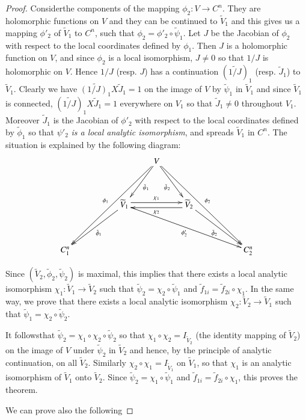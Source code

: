 \begin{proof}
Consider\pageoriginale the components of the mapping $\phi_2 : V \to
C^n$. They are holomorphic functions on $V$ and they can be continued
to $\tilde{V}_1$ and this gives us a mapping $\phi'_2$ of
$\tilde{V}_1$ to $C^n$, such that $\phi_2 = \phi'_2 \circ
\tilde{\psi}_1$. Let $J$ be the Jacobian of $\phi_2$ with respect to
the local coordinates defined by $\phi_1$. Then $J$ is a holomorphic
function on $V$, and since $\phi_2$ is a local isomorphism, $J \neq 0$
so that $1 /J$ is holomorphic on $V$. Hence $1/J$ (resp. $J$) has a
continuation $(\widetilde{1/J})_1$ (resp. $\tilde{J}_1$) to
$\tilde{V}_1$. Clearly we have $\widetilde{(1/J)_1} X\tilde{J}_1 =1 $
on the image of $V$ by $\tilde{\psi}_1$ in $\tilde{V}_1$ and since
$\tilde{V}_1$ is connected, $(\widetilde{1/J})_1 X \tilde{J}_1 =1$
everywhere on $V_1$ so that $\tilde{J}_1 \neq 0$ throughout
$V_1$. Moreover $\tilde{J}_1$ is the Jacobian of $\phi'_2$ with
respect to the local coordinates defined by $\tilde{\phi}_1$ so that
$\psi'_2$ \textit{is a local analytic isomorphism}, and spreads
$\tilde{V}_1$ in $C^n$. The situation is explained by the following
diagram:
\[
\xymatrix@R=1.3cm{
 & & & V \ar[dl]^{\tilde{\psi}_1}\ar[dr]_{\tilde{\psi}_2}
  \ar[ddlll]_{\phi_1}\ar[ddrrr]^{\phi_2} & & &\\  
 &  & \widetilde{V}_{1}
  \ar@<.3em>[rr]^{\chi_1}\ar@{<-}@<-.3em>[rr]_{\chi_2} \ar[dll]^{\tilde{\phi}_1} 
  \ar[drrrr]_{\phi'_2} && \widetilde{V}_{2}\ar[drr]_{\tilde{\phi}_2} &
  &\\  
 C^n_1 & & & & & & C^n_2 
}
\]

Since $(\tilde{V}_2, \tilde{\phi}_2, \tilde{\psi}_2)$ is maximal, this
implies that there exists a local analytic isomorphism $\chi_1:
\tilde{V}_1 \to \tilde{V}_2$ such that $\tilde{\psi}_2 = \chi_2 \circ
\tilde{\psi}_1 $ and $\tilde{f}_{1i} = \tilde{f}_{2i} \circ
\chi_1$. In the same way, we prove that there exists a local analytic
isomorphism $\chi_2 : \tilde{V}_2 \to \tilde{V}_1$ such that
$\tilde{\psi}_1 = \chi_2 \circ \tilde{\psi}_2$. 

It follows\pageoriginale that $\tilde{\psi}_2 = \chi_1 \circ \chi_2
\circ \tilde{\psi}_2$ so that $\chi_1 \circ \chi_2 = I_{\tilde{V}_2}$
(the identity mapping of $\tilde{V}_2$) on the image of $V$ under
$\tilde{\psi}_2$ in $\tilde{V}_2$ and hence, by the principle of
analytic continuation, on all $\tilde{V}_2$. Similarly $\chi_2 \circ
\chi_1 = I_{\tilde{V}_1}$ on $\tilde{V}_1$, so that $\chi_1$ is an
analytic isomorphism of $\tilde{V}_1$ onto $\tilde{V}_2$. Since
$\tilde{\psi}_2 = \chi_1 \circ \tilde{\psi}_1$ and $\tilde{f}_{1i} =
\tilde{f}_{2i} \circ \chi_1$, this proves the theorem. 

We can prove also the following
\end{proof}

